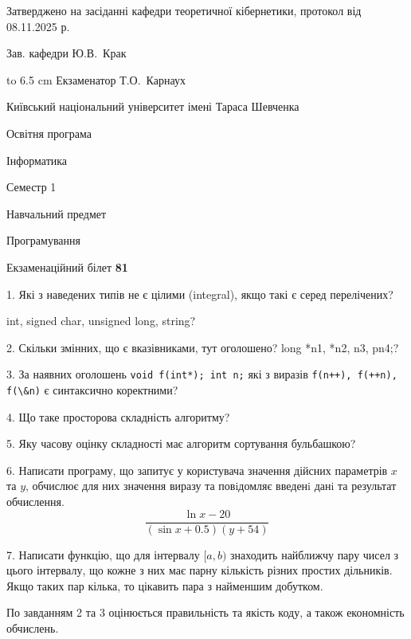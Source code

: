 \documentclass[12pt, ukrainian]{article}
\def\code#1{\Verb!#1!}
\begin{document}
{\smallskip\smallskip \begin {scriptsize} Затверджено на засіданні кафедри теоретичної кібернетики, протокол   від   08.11.2025 р.\par\smallskip\smallskip\smallskip\smallskip
{\parbox {6.5 cm} {Зав. кафедри \dotfill Ю.В.~Крак}}\hspace {0.7cm} {\hbox to 6.5 cm { Екзаменатор \dotfill Т.О.~Карнаух}} \end{scriptsize}}
\newpage
{{\begin {scriptsize}\par
{ \center  Київський національний університет імені Тараса Шевченка \par}
{\parbox {5 cm}{Освітня програма \hfill}{\parbox {7 cm}{Інформатика\hfill}}\parbox {6 cm}{\hfill Семестр 1}}\par
{\parbox {5 cm} {Навчальний предмет \hfill}\parbox {7 cm}{Програмування \hfill}\parbox {6cm}{\hfill}\par}\vspace{-15pt} \end{scriptsize}}{\center Екзаменаційний білет \No \textbf { 81 }\par}}
{%
1. Які з наведених типів не є цілими (integral), якщо такі є серед перелічених?

int, signed char, unsigned long, string?
\par
\vspace{2mm}
2. Скільки змінних, що є вказівниками, тут оголошено?
long *n1, *n2, n3, pn4;?
\par
\vspace{2mm}
3. За наявних оголошень \code{void f(int*); int n;} які з виразів \code{f(n++), f(++n), f(\&n)} є синтаксично коректними?
\par
\vspace{2mm}
4. Що таке просторова складність алгоритму?
\par
\vspace{2mm}
5. Яку часову оцінку складності має алгоритм сортування бульбашкою?
\par
\vspace{2mm}
6. Написати програму, що запитує у користувача значення дійсних параметрів $x$ та $y$, обчислює для них значення виразу та повiдомляє введенi данi та результат обчислення.
$$\frac{\ln x - 20}{(\sin x + 0.5) (y + 54)}$$ 

\par
7. Написати функцію, що для інтервалу $[a, b)$ знаходить найближчу пару чисел з цього інтервалу, що кожне з них має парну кількість різних простих дільників. Якщо таких пар кілька, то цікавить пара з найменшим добутком.

По завданням 2 та 3 оцінюється правильність та якість коду, а також економність обчислень.

}
\end{document}

